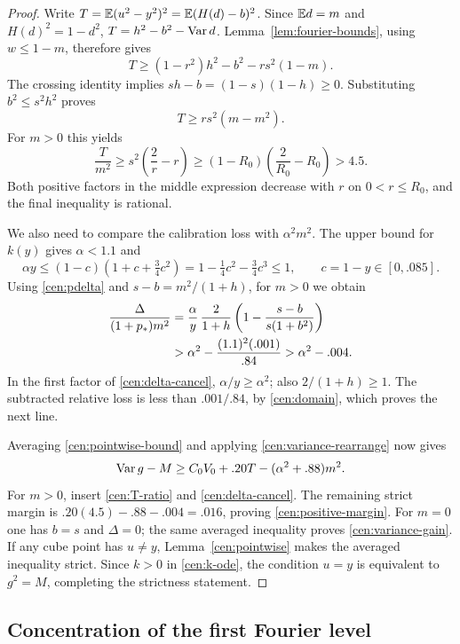 \begin{proof}
Write $T=\mathbb E(u^2-y^2)^2=\mathbb E(H(d)-b)^2$.
Since $\mathbb E d=m$ and $H(d)^2=1-d^2$,
$T=h^2-b^2-\operatorname{Var} d$.  Lemma~\ref{lem:fourier-bounds}, using $w\le1-m$,
therefore gives
\[
 T\ge(1-r^2)h^2-b^2-rs^2(1-m).
\]
The crossing identity implies $sh-b=(1-s)(1-h)\ge0$.
Substituting $b^2\le s^2h^2$ proves
\begin{equation}\label{cen:T-lower}
 T\ge rs^2(m-m^2).
\end{equation}
For $m>0$ this yields
\begin{equation}\label{cen:T-ratio}
 \frac T{m^2}\ge s^2\left(\frac2r-r\right)
 \ge(1-R_0)\left(\frac2{R_0}-R_0\right)>4.5.
\end{equation}
Both positive factors in the middle expression decrease with $r$ on
$0<r\le R_0$, and the final inequality is rational.

We also need to compare the calibration loss with $\alpha^2m^2$.
The upper bound for $k(y)$ gives $\alpha<1.1$ and
\[
 \alpha y\le(1-c)(1+c+\tfrac34c^2)
       =1-\tfrac14c^2-\tfrac34c^3\le1,
 \qquad c=1-y\in[0,.085].
\]
Using \eqref{cen:pdelta} and $s-b=m^2/(1+h)$, for $m>0$ we obtain
\begin{align}
 \frac\Delta{(1+p_*)m^2}
 &=\frac\alpha y\,\frac2{1+h}
       \left(1-\frac{s-b}{s(1+b^2)}\right)\label{cen:delta-cancel}\\
 &>\alpha^2-\frac{(1.1)^2(.001)}{.84}
 >\alpha^2-.004.\notag
\end{align}
In the first factor of \eqref{cen:delta-cancel}, $\alpha/y\ge\alpha^2$;
also $2/(1+h)\ge1$.  The subtracted relative loss is less than
$.001/.84$, by \eqref{cen:domain}, which proves the next line.

Averaging \eqref{cen:pointwise-bound} and applying
\eqref{cen:variance-rearrange} now gives
\[
 \operatorname{Var} g-M\ge C_0V_0+.20T-(\alpha^2+.88)m^2.
\]
For $m>0$, insert \eqref{cen:T-ratio} and \eqref{cen:delta-cancel}.
The remaining strict margin is
$.20(4.5)-.88-.004=.016$, proving \eqref{cen:positive-margin}.
For $m=0$ one has $b=s$ and $\Delta=0$; the same averaged inequality
proves \eqref{cen:variance-gain}.  If any cube point has $u\ne y$,
Lemma~\ref{cen:pointwise} makes the averaged inequality strict.
Since $k>0$ in \eqref{cen:k-ode}, the condition $u=y$ is equivalent to
$g^2=M$, completing the strictness statement.
\end{proof}

\subsection{Concentration of the first Fourier level}


